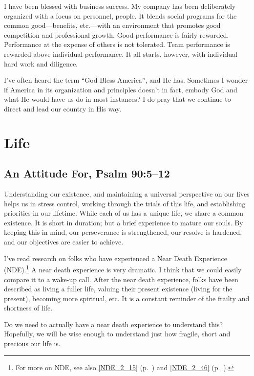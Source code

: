 \documentclass[12pt]{memoir}
\begin{document}
I have been blessed with business success. My company has been deliberately
organized with a focus on personnel, people. It blends social
programs for the common good---benefits, etc.---with an environment that
promotes good competition and professional growth. Good performance
is fairly rewarded. Performance at the expense of others is not tolerated.
Team performance is rewarded above individual performance. It all
starts, however, with individual hard work and diligence.

I've often heard the term ``God Bless America'', and He has. Sometimes
I wonder if America in its organization and principles doesn't in
fact, embody God and what He would have us do in most instances?
I do pray that we continue to direct and lead our country in His way. 

\section{Life}

\subsection[An Attitude For]{An Attitude For, Psalm 90:5--12}

Understanding our existence, and maintaining a universal perspective on our lives helps us in stress control, working through the trials of this life, and establishing priorities in our lifetime.
While each of us has a unique life, we share a common existence. It
is short in duration; but a brief experience to mature our souls. By keeping this in mind, our perseverance is strengthened, our resolve is hardened, and our objectives are easier
to achieve. 

\label{NDE_2_49}I've read research on folks who have experienced a Near Death Experience
(NDE).\footnote{For more on NDE, see also \ref{NDE_2_15} (p.\ \pageref{NDE_2_15}) and \ref{NDE_2_46} (p.\ \pageref{NDE_2_46}).} 
A near death experience is very dramatic. I think that we could easily compare it to a wake-up call. After the near death experience, folks have been described as living a fuller life, valuing their present existence (living for
the present), becoming more spiritual, etc. It is a constant reminder of the frailty and shortness of life.

Do we need to actually have a near death experience to understand
this? Hopefully, we will be wise enough to understand just how fragile,
short and precious our life is.
\end{document}

